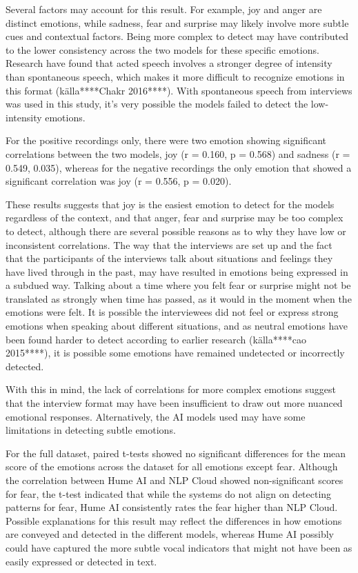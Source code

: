 Several factors may account for this result. For example, joy and anger are distinct emotions, while sadness, fear and surprise may likely involve more subtle cues and contextual factors. Being more complex to detect may have contributed to the lower consistency across the two models for these specific emotions. Research have found that acted speech involves a stronger degree of intensity than spontaneous speech, which makes it more difficult to recognize emotions in this format (källa****Chakr 2016****). With spontaneous speech from interviews was used in this study, it’s very possible the models failed to detect the low-intensity emotions.

For the positive recordings only, there were two emotion showing significant correlations between the two models, joy (r = 0.160, p = 0.568) and sadness (r = 0.549, 0.035), whereas for the negative recordings the only emotion that showed a significant correlation was joy (r = 0.556, p = 0.020).

These results suggests that joy is the easiest emotion to detect for the models regardless of the context, and that anger, fear and surprise may be too complex to detect, although there are several possible reasons as to why they have low or inconsistent correlations. The way that the interviews are set up and the fact that the participants of the interviews talk about situations and feelings they have lived through in the past, may have resulted in emotions being expressed in a subdued way. Talking about a time where you felt fear or surprise might not be translated as strongly when time has passed, as it would in the moment when the emotions were felt. It is possible the interviewees did not feel or express strong emotions when speaking about different situations, and as neutral emotions have been found harder to detect according to earlier research (källa****cao 2015****), it is possible some emotions have remained undetected or incorrectly detected.

With this in mind, the lack of correlations for more complex emotions suggest that the interview format may have been insufficient to draw out more nuanced emotional responses. Alternatively, the AI models used may have some limitations in detecting subtle emotions.


For the full dataset, paired t-tests showed no significant differences for the mean score of the emotions across the dataset for all emotions except fear. Although the correlation between Hume AI and NLP Cloud showed non-significant scores for fear, the t-test indicated that while the systems do not align on detecting patterns for fear, Hume AI consistently rates the fear higher than NLP Cloud. Possible explanations for this result may reflect the differences in how emotions are conveyed and detected in the different models, whereas Hume AI possibly could have captured the more subtle vocal indicators that might not have been as easily expressed or detected in text.

